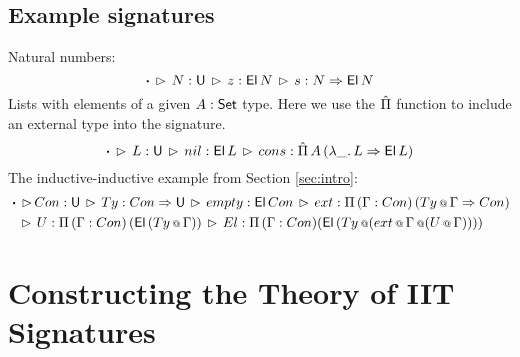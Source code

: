 \documentclass[a4paper,UKenglish,cleveref, autoref]{lipics-v2019}
\begin{document}
\subsection{Example signatures}

Natural numbers:
\[
\boldsymbol{\cdot}\,\rhd\,N:\mathsf{U}\,\rhd\,z : \mathsf{El}\,N\,\rhd\,s : N \Rightarrow \mathsf{El}\,N
\]
Lists with elements of a given $A : \mathsf{Set}$ type. Here we use the $\hat{\Pi}$ function
to include an external type into the signature.
\[
\boldsymbol{\cdot}\,\rhd\,L:\mathsf{U}\,\rhd\,nil : \mathsf{El}\,L\,\rhd\,
      cons : \hat{\Pi}\,A\,(\lambda \_.\, L\Rightarrow \mathsf{El}\,L)
\]
The inductive-inductive example from Section \ref{sec:intro}:
\begin{alignat*}{3}
  & \boldsymbol{\cdot} \,\rhd\,Con : \mathsf{U}\,\rhd\,Ty : Con\Rightarrow\mathsf{U}\,\rhd\,empty : \mathsf{El}\,Con\,\rhd\,ext : \Pi\,(\Gamma : Con)\,(Ty\mathop{{\scriptstyle @}}\Gamma \Rightarrow Con) \\
  & \hspace{0.5em}\,\rhd\, U : \Pi\,(\Gamma:Con)\,(\mathsf{El}\,(Ty\mathop{{\scriptstyle @}}\Gamma))
    \,\rhd\,El : \Pi\,(\Gamma : Con)(\mathsf{El}\,(Ty\mathop{{\scriptstyle @}}(ext\mathop{{\scriptstyle @}}\Gamma\mathop{{\scriptstyle @}} (U\mathop{{\scriptstyle @}}\Gamma))))
\end{alignat*}

\section{Constructing the Theory of IIT Signatures}
\label{sec:ambroise}





\end{document}
